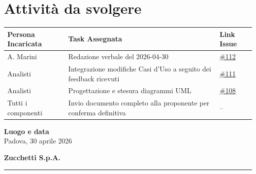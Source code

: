 \documentclass[a4paper, 10pt, colorlinks=true, linkcolor=black, urlcolor=blue, citecolor=blue, hidelinks]{article}
\newcommand{\dataverbale}{2026-04-30}
\newcommand{\issue}[1]{\href{https://github.com/thebitless-group-swe/thebitless.github.io/issues/#1}{\##1}}
\begin{document}
\section{Attività da svolgere}

\begin{center}
\renewcommand{\arraystretch}{1.4}
\begin{tabular}{|p{4.2cm}|p{6.2cm}|p{2.2cm}|}
\hline
\textbf{Persona Incaricata} & \textbf{Task Assegnata} & \centering\textbf{Link Issue} \tabularnewline
\hline
A. Marini & Redazione verbale del \dataverbale & \centering \issue{112} \tabularnewline
\hline
Analisti & Integrazione modifiche Casi d'Uso a seguito dei feedback ricevuti & \centering \issue{111} \tabularnewline
\hline
Analisti & Progettazione e stesura diagrammi UML & \centering \issue{108} \tabularnewline
\hline
Tutti i componenti & Invio documento completo alla proponente per conferma definitiva & \centering -- \tabularnewline
\hline
\end{tabular}
\end{center}

\vfill

\noindent
\begin{minipage}[t]{0.45\textwidth}
  \textbf{Luogo e data} \\
  \vspace{0.5cm}
  Padova, 30 aprile 2026
\end{minipage}
\hfill
\begin{minipage}[t]{0.45\textwidth}
  \raggedleft
  \textbf{Zucchetti S.p.A.} \\
  \vspace{1.8cm} 
  \rule{6cm}{0.4pt}
\end{minipage}
\end{document}
